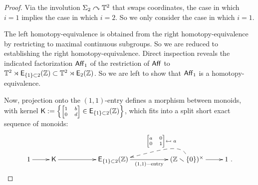 \begin{proof}
Via the involution $\Sigma_2 \curvearrowright \mathbb T^2$ that swaps coordinates, the case in which $i=1$ implies the case in which $i=2$.
So we only consider the case in which $i=1$.


The left homotopy-equivalence is obtained from the right homotopy-equivalence by restricting to 
maximal continuous subgroups.
So we are reduced to establishing the right homotopy-equivalence.
Direct inspection reveals the indicated factorization $\operatorname{\sf Aff}_1$ of the restriction of $\operatorname{\sf Aff}$ to $\mathbb T^2 \rtimes \mathsf E_{\{1\}\subset 2}(\mathbb Z) \subset  \mathbb T^2 \rtimes \operatorname{\mathsf E_2(\mathbb Z)} $.
So we are left to show that $\operatorname{\sf Aff}_1$ is a homotopy-equivalence.  

Now, projection onto the $(1,1)$-entry defines a morphism between monoids, with kernel $\sK := \Bigl\{ \mbox{\scriptsize$\begin{bmatrix} 1 & b \\ 0 & d \end{bmatrix}$}\in \sE_{\{1\}\subset 2}(\ZZ) \Bigr\}$, which fits into a split short exact sequence of monoids:
\[
\xymatrix{
1
\ar[r] 
&
\sK
\ar[rr]
&&
\sE_{\{1\}\subset 2}(\ZZ) 
\ar[rr]_-{ (1,1)-{\rm entry}}
&&
(\ZZ \smallsetminus \{0\})^\times
\ar[r]
\ar@{-->}@(u,-)[ll]_-{ \mbox{\scriptsize$\begin{bmatrix} a & 0 \\ 0 & 1 \end{bmatrix} $} \mapsfrom ~a}
&
1
~.
}
\]


\end{proof}
